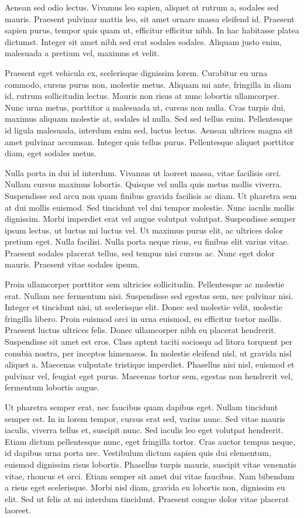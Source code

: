 \documentclass{article}
\begin{document}
Aenean sed odio lectus. Vivamus leo sapien, aliquet at rutrum a, sodales sed
mauris. Praesent pulvinar mattis leo, sit amet ornare massa eleifend id.
Praesent sapien purus, tempor quis quam ut, efficitur efficitur nibh. In hac
habitasse platea dictumst. Integer sit amet nibh sed erat sodales sodales.
Aliquam justo enim, malesuada a pretium vel, maximus et velit.

Praesent eget vehicula ex, scelerisque dignissim lorem. Curabitur eu urna
commodo, cursus purus non, molestie metus. Aliquam mi ante, fringilla in diam
id, rutrum sollicitudin lectus. Mauris non risus at nunc lobortis ullamcorper.
Nunc urna metus, porttitor a malesuada ut, cursus non nulla. Cras turpis dui,
maximus aliquam molestie at, sodales id nulla. Sed sed tellus enim.
Pellentesque id ligula malesuada, interdum enim sed, luctus lectus. Aenean
ultrices magna sit amet pulvinar accumsan. Integer quis tellus purus.
Pellentesque aliquet porttitor diam, eget sodales metus.

Nulla porta in dui id interdum. Vivamus ut laoreet massa, vitae facilisis orci.
Nullam cursus maximus lobortis. Quisque vel nulla quis metus mollis viverra.
Suspendisse sed arcu non quam finibus gravida facilisis ac diam. Ut pharetra
sem at dui mollis euismod. Sed tincidunt vel dui tempor molestie. Nunc iaculis
mollis dignissim. Morbi imperdiet erat vel augue volutpat volutpat. Suspendisse
semper ipsum lectus, ut luctus mi luctus vel. Ut maximus purus elit, ac
ultrices dolor pretium eget. Nulla facilisi. Nulla porta neque risus, eu
finibus elit varius vitae. Praesent sodales placerat tellus, sed tempus nisi
cursus ac. Nunc eget dolor mauris. Praesent vitae sodales ipsum.

Proin ullamcorper porttitor sem ultricies sollicitudin. Pellentesque ac
molestie erat. Nullam nec fermentum nisi. Suspendisse sed egestas sem, nec
pulvinar nisi. Integer et tincidunt nisi, ut scelerisque elit. Donec sed
molestie velit, molestie fringilla libero. Proin euismod orci in urna euismod,
eu efficitur tortor mollis. Praesent luctus ultrices felis. Donec ullamcorper
nibh eu placerat hendrerit. Suspendisse sit amet est eros. Class aptent taciti
sociosqu ad litora torquent per conubia nostra, per inceptos himenaeos. In
molestie eleifend nisl, ut gravida nisl aliquet a. Maecenas vulputate tristique
imperdiet. Phasellus nisi nisl, euismod et pulvinar vel, feugiat eget purus.
Maecenas tortor sem, egestas non hendrerit vel, fermentum lobortis augue.

Ut pharetra semper erat, nec faucibus quam dapibus eget. Nullam tincidunt
semper est. In in lorem tempor, cursus erat sed, varius nunc. Sed vitae mauris
iaculis, viverra tellus et, suscipit nunc. Sed iaculis leo eget volutpat
hendrerit. Etiam dictum pellentesque nunc, eget fringilla tortor. Cras auctor
tempus neque, id dapibus urna porta nec. Vestibulum dictum sapien quis dui
elementum, euismod dignissim risus lobortis. Phasellus turpis mauris, suscipit
vitae venenatis vitae, rhoncus et orci. Etiam semper sit amet dui vitae
faucibus. Nam bibendum a risus eget scelerisque. Morbi nisl diam, gravida eu
lobortis non, dignissim eu elit. Sed ut felis at mi interdum tincidunt.
Praesent congue dolor vitae placerat laoreet.
\end{document}
